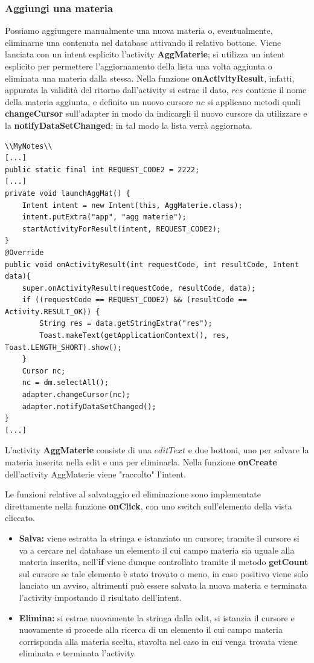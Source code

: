 \documentclass[a4paper, 50pt, twoside]{article}
\begin{document}
\subsubsection{Aggiungi una materia}
Possiamo aggiungere manualmente una nuova materia o, eventualmente, eliminarne una contenuta nel database attivando il relativo bottone. Viene lanciata con un intent esplicito l'activity \textbf{AggMaterie}; si utilizza un intent esplicito per permettere l'aggiornamento della lista una volta aggiunta o eliminata una materia dalla stessa. Nella funzione \textbf{onActivityResult}, infatti, appurata la validità del ritorno dall'activity si estrae il dato, $res$ contiene il nome della materia aggiunta, e definito un nuovo cursore $nc$ si applicano metodi quali \textbf{changeCursor} sull'adapter in modo da indicargli il nuovo cursore da utilizzare e la \textbf{notifyDataSetChanged}; in tal modo la lista verrà aggiornata.

\begin{lstlisting}
\\MyNotes\\
[...]
public static final int REQUEST_CODE2 = 2222;
[...]
private void launchAggMat() {
	Intent intent = new Intent(this, AggMaterie.class);
	intent.putExtra("app", "agg materie");
	startActivityForResult(intent, REQUEST_CODE2);
}
@Override
public void onActivityResult(int requestCode, int resultCode, Intent data){
	super.onActivityResult(requestCode, resultCode, data);
	if ((requestCode == REQUEST_CODE2) && (resultCode == Activity.RESULT_OK)) {
		String res = data.getStringExtra("res");
		Toast.makeText(getApplicationContext(), res, Toast.LENGTH_SHORT).show();
	}
	Cursor nc;
	nc = dm.selectAll();
	adapter.changeCursor(nc);
	adapter.notifyDataSetChanged();
}
[...]
\end{lstlisting}

L'activity \textbf{AggMaterie} consiste di una $editText$ e due bottoni, uno per salvare la materia inserita nella edit e una per eliminarla.
Nella funzione \textbf{onCreate} dell'activity AggMaterie viene "raccolto" l'intent.

Le funzioni relative al salvataggio ed eliminazione sono implementate direttamente nella funzione \textbf{onClick}, con uno switch sull'elemento della vista cliccato.
\begin{itemize}
\item \textbf{Salva:} viene estratta la stringa e istanziato un cursore; tramite il cursore si va a cercare nel database un elemento il cui campo materia sia uguale alla materia inserita, nell'\textbf{if} viene dunque controllato tramite il metodo \textbf{getCount} sul cursore se tale elemento è stato trovato o meno, in caso positivo viene solo lanciato un avviso, altrimenti può essere salvata la nuova materia e terminata l'activity impostando il risultato dell'intent.
\item \textbf{Elimina:} si estrae nuovamente la stringa dalla edit, si istanzia il cursore e nuovamente si procede alla ricerca di un elemento il cui campo materia corrisponda alla materia scelta, stavolta nel caso in cui venga trovata viene eliminata e terminata l'activity.
\end{itemize}
\end{document}
